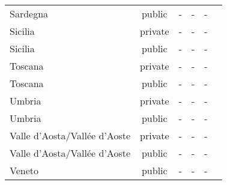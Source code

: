 \begin{table}[H]
\begin{tabularx}{\textwidth}{Xccccc}
            Sardegna & public & - & - & - \\
            Sicilia & private & - & - & - \\
            Sicilia & public & - & - & - \\
            Toscana & private & - & - & - \\
            Toscana & public & - & - & - \\
            Umbria & private & - & - & - \\
            Umbria & public & - & - & - \\
            Valle d’Aosta/Vallée d’Aoste & private & - & - & - \\
            Valle d’Aosta/Vallée d’Aoste & public & - & - & - \\
            Veneto & public & - & - & - \\
        \bottomrule
    \end{tabularx}
\end{table}
    